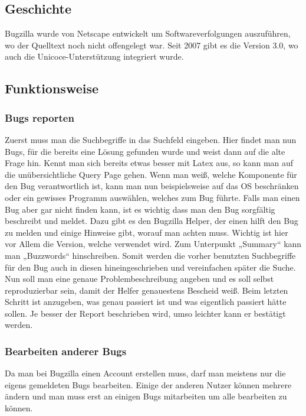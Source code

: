 \subsection{Geschichte}
Bugzilla wurde von Netscape entwickelt um Softwareverfolgungen auszuführen, wo der Quelltext noch nicht offengelegt war. Seit 2007 gibt es die Version 3.0, wo auch die Unicoce-Unterstützung integriert wurde.

\subsection{Funktionsweise}

\subsubsection{Bugs reporten}
Zuerst muss man die Suchbegriffe in das Suchfeld eingeben. Hier findet man nun Bugs, für die bereits eine Lösung gefunden wurde und weist dann auf die alte Frage hin.
Kennt man sich bereits etwas besser mit Latex aus, so kann man auf die unübersichtliche Query Page gehen. Wenn man weiß, welche Komponente für den Bug verantwortlich ist, kann man nun beispielsweise auf das OS beschränken oder ein gewisses Programm auswählen, welches zum Bug führte. 
Falls man einen Bug aber gar nicht finden kann, ist es wichtig dass man den Bug sorgfältig beschreibt und meldet. Dazu gibt es den Bugzilla Helper, der einen hilft den Bug zu melden und einige Hinweise gibt, worauf man achten muss. Wichtig ist hier vor Allem die Version, welche verwendet wird. Zum Unterpunkt „Summary“ kann man „Buzzwords“ hinschreiben. Somit werden die vorher benutzten Suchbegriffe für den Bug auch in diesen hineingeschrieben und vereinfachen später die Suche. Nun soll man eine genaue Problembeschreibung angeben und es soll selbst reproduzierbar sein, damit der Helfer genauestens Bescheid weiß. 
Beim letzten Schritt ist anzugeben, was genau passiert ist und was eigentlich passiert hätte sollen. 
Je besser der Report beschrieben wird, umso leichter kann er bestätigt werden.

\subsubsection{Bearbeiten anderer Bugs}
Da man bei Bugzilla einen Account erstellen muss, darf man meistens nur die eigens gemeldeten Bugs bearbeiten. Einige der anderen Nutzer können mehrere ändern und man muss erst an einigen Bugs mitarbeiten um alle bearbeiten zu können.


